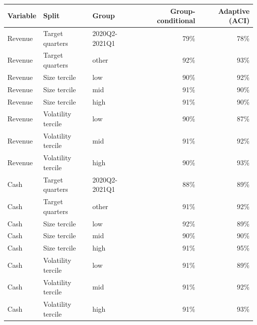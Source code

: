 \begin{tabular}{lllrr}
\toprule
Variable & Split & Group & Group-conditional & Adaptive (ACI) \\
\midrule
Revenue & Target quarters & 2020Q2-2021Q1 & 79\% & 78\% \\
Revenue & Target quarters & other & 92\% & 93\% \\
Revenue & Size tercile & low & 90\% & 92\% \\
Revenue & Size tercile & mid & 91\% & 90\% \\
Revenue & Size tercile & high & 91\% & 90\% \\
Revenue & Volatility tercile & low & 90\% & 87\% \\
Revenue & Volatility tercile & mid & 91\% & 92\% \\
Revenue & Volatility tercile & high & 90\% & 93\% \\
\addlinespace
Cash & Target quarters & 2020Q2-2021Q1 & 88\% & 89\% \\
Cash & Target quarters & other & 91\% & 92\% \\
Cash & Size tercile & low & 92\% & 89\% \\
Cash & Size tercile & mid & 90\% & 90\% \\
Cash & Size tercile & high & 91\% & 95\% \\
Cash & Volatility tercile & low & 91\% & 89\% \\
Cash & Volatility tercile & mid & 91\% & 92\% \\
Cash & Volatility tercile & high & 91\% & 93\% \\
\bottomrule
\end{tabular}
